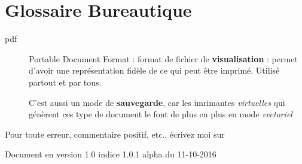 \documentclass[a4paper,12pt,french]{sphinxmanual}
\begin{document}
\section{Glossaire Bureautique}
\label{burotic/glossaire_burotic:glossaire-burotic}\label{burotic/glossaire_burotic::doc}\label{burotic/glossaire_burotic:glossaire-bureautique}\begin{description}
\item[{pdf}] \leavevmode{}\label{burotic/glossaire_burotic:term-pdf}
Portable Document Format : format de fichier de \textbf{visualisation} : permet d'avoir une représentation fidèle de ce qui peut être imprimé. Utilisé partout et par tous.

C'est aussi un mode de \textbf{sauvegarde}, car les imrimantes \emph{virtuelles} qui génèrent ces type de document le font de plus en plus en mode \emph{vectoriel}

\end{description}

Pour toute erreur, commentaire positif, etc., écrivez moi sur 

Document en version 1.0 indice 1.0.1 alpha du 11-10-2016



\renewcommand{\indexname}{Index}
\printindex
\end{document}
